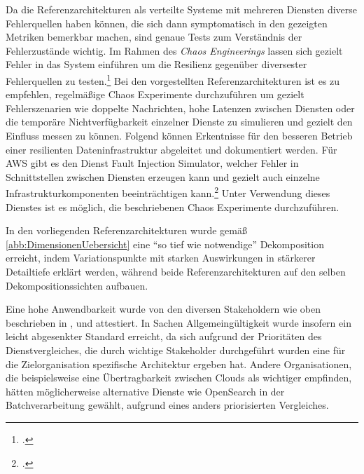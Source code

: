 Da die Referenzarchitekturen als verteilte Systeme mit mehreren Diensten diverse Fehlerquellen haben können, die sich dann symptomatisch in den gezeigten Metriken bemerkbar machen, sind genaue Tests zum Verständnis der Fehlerzustände wichtig. Im Rahmen des \textit{Chaos Engineerings} lassen sich gezielt Fehler in das System einführen um die Resilienz gegenüber diversester Fehlerquellen zu testen.\footcite[Vgl.][]{Augsten.2020} Bei den vorgestellten Referenzarchitekturen ist es zu empfehlen, regelmäßige Chaos Experimente durchzuführen um gezielt Fehlerszenarien wie doppelte Nachrichten, hohe Latenzen zwischen Diensten oder die temporäre Nichtverfügbarkeit einzelner Dienste zu simulieren und gezielt den Einfluss messen zu können. Folgend können Erkentnisse für den besseren Betrieb einer resilienten Dateninfrastruktur abgeleitet und dokumentiert werden. Für \ac{AWS} gibt es den Dienst Fault Injection Simulator, welcher Fehler in Schnittstellen zwischen Diensten erzeugen kann und gezielt auch einzelne Infrastrukturkomponenten beeinträchtigen kann.\footcite[Vgl.][]{Barr.2021b} Unter Verwendung dieses Dienstes ist es möglich, die beschriebenen Chaos Experimente durchzuführen.

In den vorliegenden Referenzarchitekturen wurde gemäß \autoref{abb:DimensionenUebersicht} eine \enquote{so tief wie notwendige} Dekomposition erreicht, indem Variationspunkte mit starken Auswirkungen in stärkerer Detailtiefe erklärt werden, während beide Referenzarchitekturen auf den selben Dekompositionssichten aufbauen.

Eine hohe Anwendbarkeit wurde von den diversen Stakeholdern wie oben beschrieben in ,  und  attestiert.
In Sachen Allgemeingültigkeit wurde insofern ein leicht abgesenkter Standard erreicht, da sich aufgrund der Prioritäten des Dienstvergleiches, die durch wichtige Stakeholder durchgeführt wurden eine für die Zielorganisation spezifische Architektur ergeben hat. Andere Organisationen, die beispielsweise eine Übertragbarkeit zwischen Clouds als wichtiger empfinden, hätten möglicherweise alternative Dienste wie OpenSearch in der Batchverarbeitung gewählt, aufgrund eines anders priorisierten Vergleiches.